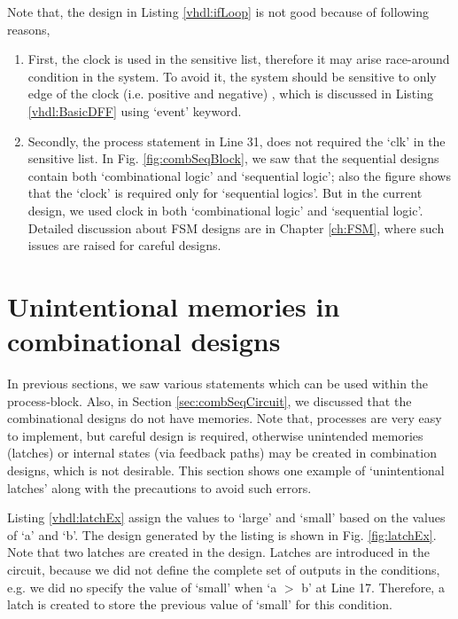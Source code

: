 \begin{noNumBox}
	Note that, the design in Listing \ref{vhdl:ifLoop} is not good because of following reasons,
	\begin{enumerate}		
		\item First, the clock is used in the sensitive list, therefore it may arise race-around condition in the system. To avoid it, the system should be sensitive to only edge of the clock (i.e. positive and negative) , which is discussed in Listing \ref{vhdl:BasicDFF} using `event' keyword.
		
		\item Secondly, the process statement in Line 31, does not required the `clk' in the sensitive list. In Fig. \ref{fig:combSeqBlock}, we saw that the sequential designs contain both `combinational logic' and `sequential logic'; also the figure shows that the `clock' is required  only for `sequential logics'. But in the current design, we used clock in both `combinational logic' and `sequential logic'. Detailed discussion about FSM designs are in Chapter \ref{ch:FSM}, where such issues are raised for careful designs.  
	\end{enumerate}
	
\end{noNumBox}

\section{Unintentional memories in combinational designs}
In previous sections, we saw various statements which can be used within the process-block. Also, in Section \ref{sec:combSeqCircuit}, we discussed that the combinational designs do not have memories. Note that, processes are very easy to implement, but careful design is required, otherwise unintended memories (latches) or internal states (via feedback paths) may be created in combination designs, which is not desirable. This section shows one example of `unintentional latches' along with the precautions to avoid such errors. 

Listing \ref{vhdl:latchEx} assign the values to `large' and `small' based on the values of `a' and `b'. The design generated by the listing is shown in Fig. \ref{fig:latchEx}. Note that two latches are created in the design. Latches are introduced in the circuit, because we did not define the complete set of outputs in the conditions, e.g. we did no specify the value of `small' when `a $>$ b' at Line 17. Therefore, a latch is created to store the previous value of `small' for this condition. 

